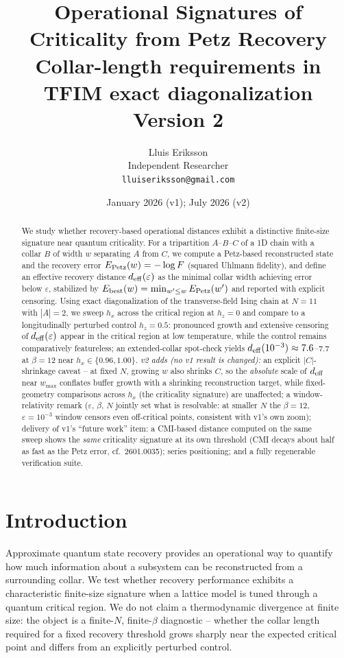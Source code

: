 \documentclass[11pt]{article}
\title{Operational Signatures of Criticality from Petz Recovery\\
{\large Collar-length requirements in TFIM exact diagonalization}\\
{\normalsize Version 2}}
\author{Lluis Eriksson\\ Independent Researcher\\ \texttt{lluiseriksson@gmail.com}}
\date{January 2026 (v1); July 2026 (v2)}
\theoremstyle{remark}
\newcommand{\deff}{d_{\rm eff}}
\begin{document}
\maketitle

\begin{abstract}
We study whether recovery-based operational distances exhibit a distinctive
finite-size signature near quantum criticality. For a tripartition
$A$--$B$--$C$ of a 1D chain with a collar $B$ of width $w$ separating $A$
from $C$, we compute a Petz-based reconstructed state and the recovery
error $E_{\rm Petz}(w) = -\log F$ (squared Uhlmann fidelity), and define an
effective recovery distance $\deff(\varepsilon)$ as the minimal collar
width achieving error below $\varepsilon$, stabilized by $E_{\rm best}(w)
= \min_{w' \le w} E_{\rm Petz}(w')$ and reported with explicit censoring.
Using exact diagonalization of the transverse-field Ising chain at
$N = 11$ with $|A| = 2$, we sweep $h_x$ across the critical region at
$h_z = 0$ and compare to a longitudinally perturbed control $h_z = 0.5$:
pronounced growth and extensive censoring of $\deff(\varepsilon)$ appear
in the critical region at low temperature, while the control remains
comparatively featureless; an extended-collar spot-check yields
$\deff(10^{-3}) \approx 7.6$--$7.7$ at $\beta = 12$ near $h_x \in \{0.96,
1.00\}$. \emph{v2 adds (no v1 result is changed):} an explicit
$|C|$-shrinkage caveat -- at fixed $N$, growing $w$ also shrinks $C$, so
the \emph{absolute} scale of $\deff$ near $w_{\max}$ conflates buffer
growth with a shrinking reconstruction target, while fixed-geometry
comparisons across $h_x$ (the criticality signature) are unaffected; a
window-relativity remark ($\varepsilon$, $\beta$, $N$ jointly set what is
resolvable: at smaller $N$ the $\beta = 12$, $\varepsilon = 10^{-3}$
window censors even off-critical points, consistent with v1's own zoom);
delivery of v1's ``future work'' item: a CMI-based distance computed on
the same sweep shows the \emph{same} criticality signature at its own
threshold (CMI decays about half as fast as the Petz error, cf.\
2601.0035); series positioning; and a fully regenerable verification
suite.
\end{abstract}

\section{Introduction}
Approximate quantum state recovery provides an operational way to quantify
how much information about a subsystem can be reconstructed from a
surrounding collar. We test whether recovery performance exhibits a
characteristic finite-size signature when a lattice model is tuned through
a quantum critical region. We do not claim a thermodynamic divergence at
finite size: the object is a finite-$N$, finite-$\beta$ diagnostic --
whether the collar length required for a fixed recovery threshold grows
sharply near the expected critical point and differs from an explicitly
perturbed control.
\end{document}

